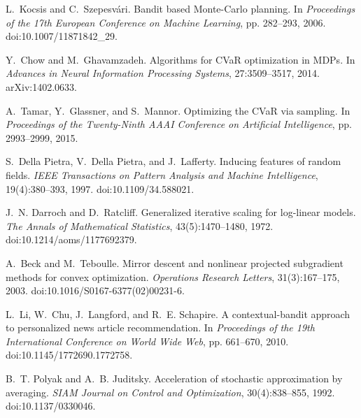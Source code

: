 \documentclass[10pt]{article}
\newcommand{\1}{\mathbf{1}}
\theoremstyle{plain}
\begin{document}
\begin{thebibliography}{99}
L.~Kocsis and C.~Szepesv\'{a}ri.
\newblock Bandit based Monte-Carlo planning.
\newblock In \emph{Proceedings of the 17th European Conference on Machine Learning}, pp. 282--293, 2006.
\newblock doi:10.1007/11871842\_29.

Y.~Chow and M.~Ghavamzadeh.
\newblock Algorithms for {CVaR} optimization in {MDPs}.
\newblock In \emph{Advances in Neural Information Processing Systems}, 27:3509--3517, 2014.
\newblock arXiv:1402.0633.

A.~Tamar, Y.~Glassner, and S.~Mannor.
\newblock Optimizing the {CVaR} via sampling.
\newblock In \emph{Proceedings of the Twenty-Ninth AAAI Conference on Artificial Intelligence}, pp. 2993--2999, 2015.

S.~Della Pietra, V.~Della Pietra, and J.~Lafferty.
\newblock Inducing features of random fields.
\newblock \emph{IEEE Transactions on Pattern Analysis and Machine Intelligence}, 19(4):380--393, 1997.
\newblock doi:10.1109/34.588021.

J.~N. Darroch and D.~Ratcliff.
\newblock Generalized iterative scaling for log-linear models.
\newblock \emph{The Annals of Mathematical Statistics}, 43(5):1470--1480, 1972.
\newblock doi:10.1214/aoms/1177692379.

A.~Beck and M.~Teboulle.
\newblock Mirror descent and nonlinear projected subgradient methods for convex optimization.
\newblock \emph{Operations Research Letters}, 31(3):167--175, 2003.
\newblock doi:10.1016/S0167-6377(02)00231-6.

L.~Li, W.~Chu, J.~Langford, and R.~E. Schapire.
\newblock A contextual-bandit approach to personalized news article recommendation.
\newblock In \emph{Proceedings of the 19th International Conference on World Wide Web}, pp. 661--670, 2010.
\newblock doi:10.1145/1772690.1772758.

B.~T. Polyak and A.~B. Juditsky.
\newblock Acceleration of stochastic approximation by averaging.
\newblock \emph{SIAM Journal on Control and Optimization}, 30(4):838--855, 1992.
\newblock doi:10.1137/0330046.

\end{thebibliography}
\end{document}
